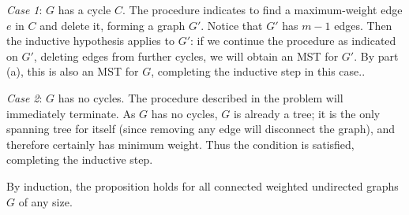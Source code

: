 \documentclass[12pt,twoside]{article}
\begin{document}
\begin{problem}{13}
{    \emph{Case 1}: $G$ has a cycle $C$. The procedure indicates to find a maximum-weight edge $e$ in $C$ and delete it, forming a graph $G'$. Notice that $G'$ has $m-1$ edges. Then the inductive hypothesis applies to $G'$: if we continue the procedure as indicated on $G'$, deleting edges from further cycles, we will obtain an MST for $G'$. By part (a), this is also an MST for $G$, completing the inductive step in this case..

    \emph{Case 2}: $G$ has no cycles. The procedure described in the problem will immediately terminate. As $G$ has no cycles, $G$ is already a tree; it is the only spanning tree for itself (since removing any edge will disconnect the graph), and therefore certainly has minimum weight. Thus the condition is satisfied, completing the inductive step. 

By induction, the proposition holds for all connected weighted undirected graphs $G$ of any size.
}

    \eparts

\end{problem}
\end{document}
